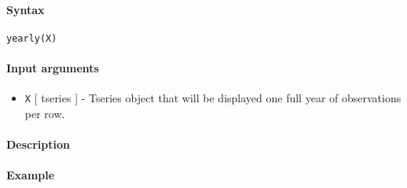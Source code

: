 


	\paragraph{Syntax}\label{syntax}

\begin{verbatim}
yearly(X)
\end{verbatim}

\paragraph{Input arguments}\label{input-arguments}

\begin{itemize}
\itemsep1pt\parskip0pt
\item
  \texttt{X} {[} tseries {]} - Tseries object that will be displayed one
  full year of observations per row.
\end{itemize}

\paragraph{Description}\label{description}

\paragraph{Example}\label{example}


